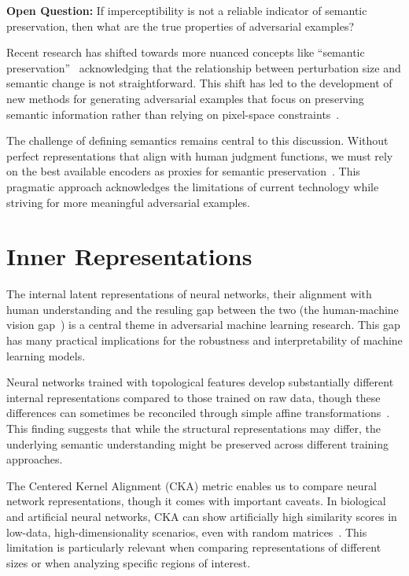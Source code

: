 \documentclass[a4paper, oneside]{discothesis}
\begin{document}
\begin{highlightbox}
	\textbf{Open Question:} If imperceptibility is not a reliable indicator of semantic preservation, then what are the true properties of adversarial examples?
\end{highlightbox}

Recent research has shifted towards more nuanced concepts like ``semantic preservation''~\cite{careil2023towards} acknowledging that the relationship between perturbation size and semantic change is not straightforward. This shift has led to the development of new methods for generating adversarial examples that focus on preserving semantic information rather than relying on pixel-space constraints~\cite{lee2020semantics}.

The challenge of defining semantics remains central to this discussion. Without perfect representations that align with human judgment functions, we must rely on the best available encoders as proxies for semantic preservation~\cite{herel2023preserving}. This pragmatic approach acknowledges the limitations of current technology while striving for more meaningful adversarial examples.

\section{Inner Representations}

The internal latent representations of neural networks, their alignment with human understanding and the resuling gap between the two (the human-machine vision gap~\cite{geirhos2021partial}) is a central theme in adversarial machine learning research. This gap has many practical implications for the robustness and interpretability of machine learning models.

Neural networks trained with topological features develop substantially different internal representations compared to those trained on raw data, though these differences can sometimes be reconciled through simple affine transformations~\cite{mcguire2023neural}. This finding suggests that while the structural representations may differ, the underlying semantic understanding might be preserved across different training approaches.

The Centered Kernel Alignment (CKA) metric enables us to compare neural network representations, though it comes with important caveats. In biological and artificial neural networks, CKA can show artificially high similarity scores in low-data, high-dimensionality scenarios, even with random matrices~\cite{murphy2024correcting}. This limitation is particularly relevant when comparing representations of different sizes or when analyzing specific regions of interest.
\end{document}
